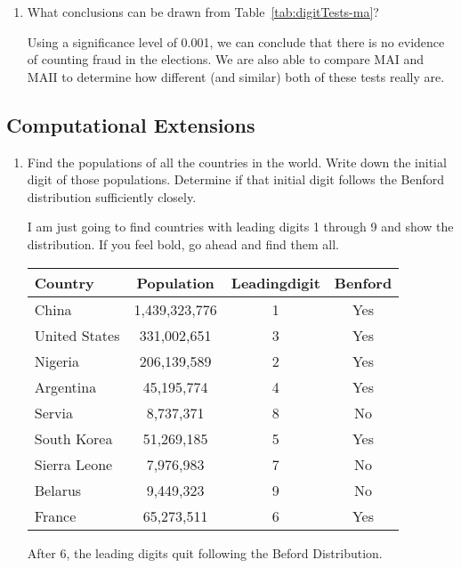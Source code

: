 \begin{enumerate}
 \item What conclusions can be drawn from Table~\ref{tab:digitTests-ma}?
\begin{solution}
Using a significance level of 0.001, we can conclude that there is no evidence of counting fraud in the elections. We are also able to compare MAI and MAII to determine how different (and similar) both of these tests really are. 
\end{solution}
\end{enumerate}




\subsection*{Computational Extensions}
\begin{enumerate}

 \item Find the populations of all the countries in the world. Write down the initial digit of those populations. Determine if that initial digit follows the Benford distribution sufficiently closely.
\begin{solution}
I am just going to find countries with leading digits 1 through 9 and show the distribution. If you feel bold, go ahead and find them all. 
\begin{center}
\begin{tabular}{lccc}
Country & Population & Leading\:digit & Benford \\
\midrule
China         & 1,439,323,776           & 1  & Yes \\
United States          & 331,002,651          & 3  & Yes  \\
Nigeria          & 206,139,589           & 2  & Yes  \\
Argentina          & 45,195,774           & 4  & Yes  \\
Servia       & 8,737,371           & 8  & No  \\
South Korea          & 51,269,185           & 5  & Yes  \\
Sierra Leone          & 7,976,983           & 7  & No  \\
Belarus          & 9,449,323           & 9 & No  \\
France          & 65,273,511           & 6  & Yes  \\
\end{tabular}
\end{center}
After 6, the leading digits quit following the Beford Distribution. 
\end{solution}


\end{enumerate}
